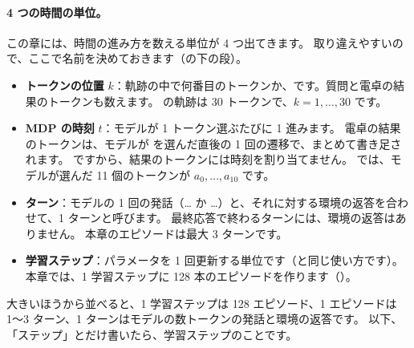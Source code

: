 \paragraph{4 つの時間の単位。}
この章には、時間の進み方を数える単位が 4 つ出てきます。
取り違えやすいので、ここで名前を決めておきます（の下の段）。
\begin{itemize}
\item \textbf{トークンの位置} $k$：軌跡の中で何番目のトークンか、です。質問と電卓の結果のトークンも数えます。
の軌跡は 30 トークンで、$k=1,\dots,30$ です。
\item \textbf{MDP の時刻} $t$：モデルが 1 トークン選ぶたびに 1 進みます。
電卓の結果のトークンは、モデルが  を選んだ直後の 1 回の遷移で、まとめて書き足されます。
ですから、結果のトークンには時刻を割り当てません。
では、モデルが選んだ 11 個のトークンが $a_0,\dots,a_{10}$ です。
\item \textbf{ターン}：モデルの 1 回の発話（… か …）と、それに対する環境の返答を合わせて、1 ターンと呼びます。
最終応答で終わるターンには、環境の返答はありません。
本章のエピソードは最大 3 ターンです。
\item \textbf{学習ステップ}：パラメータを 1 回更新する単位です（と同じ使い方です）。
本章では、1 学習ステップに 128 本のエピソードを作ります（）。
\end{itemize}
大きいほうから並べると、1 学習ステップは 128 エピソード、1 エピソードは 1〜3 ターン、1 ターンはモデルの数トークンの発話と環境の返答です。
以下、「ステップ」とだけ書いたら、学習ステップのことです。

